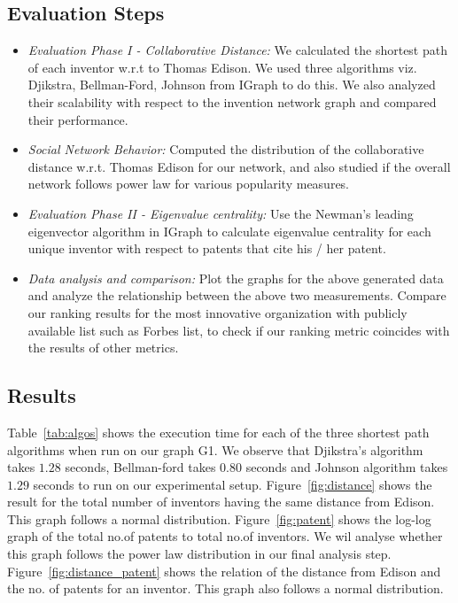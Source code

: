 \subsection{Evaluation Steps}
	\begin{itemize}
		\squish
		\item {\em Evaluation Phase I - Collaborative Distance:} We calculated the 
		shortest path of each inventor w.r.t to Thomas Edison. We used three
		algorithms viz. Djikstra, Bellman-Ford, Johnson from IGraph to do this. We
		also analyzed their scalability with respect to the invention network graph
		and compared their performance.
		\item {\em Social Network Behavior:} Computed the distribution of the 
		collaborative distance w.r.t. Thomas Edison for our network, and also studied
		if the overall network follows power law for various popularity measures.
		\item {\em Evaluation Phase II - Eigenvalue centrality:} Use the Newman's
		leading eigenvector algorithm in IGraph to calculate eigenvalue centrality
		for each unique inventor with respect to patents that cite his / her patent.
		\item {\em Data analysis and comparison:} Plot the graphs for the above
		generated data and analyze the relationship between the above two
		measurements. Compare our ranking results for the most innovative organization
		with publicly available list such as Forbes list, to check if our ranking
		metric coincides with the results of other metrics.
	\end{itemize}

\subsection{Results}
Table~\ref{tab:algos} shows the execution time for each of the three shortest
path algorithms  when run on our graph G1. We observe that Djikstra's
algorithm takes $1.28$ seconds, Bellman-ford takes $0.80$ seconds and Johnson
algorithm takes $1.29$ seconds to run on our experimental setup.
Figure~\ref{fig:distance} shows the result for the total number of inventors
having the same distance from Edison. This graph follows a normal
distribution. Figure~\ref{fig:patent} shows the log-log graph of the total
no.of patents to total no.of inventors. We wil analyse whether this graph
follows the power law distribution in our  final analysis step.
Figure~\ref{fig:distance_patent} shows the relation of the distance from
Edison and the no. of patents for an inventor. This graph also follows a
normal distribution.

